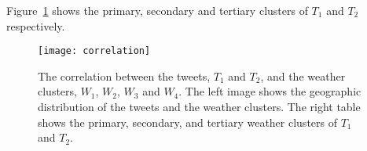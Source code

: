 Figure~\ref{fig:correlation} shows the primary, secondary and tertiary clusters of $T_1$ and $T_2$ respectively.

\begin{figure}[t]
\begin{center}
\texttt{[image: correlation]}
\end{center}
\vspace{-.1in}
\caption{The correlation between the tweets, $T_1$ and $T_2$, and the weather clusters, $W_1$, $W_2$, $W_3$ and $W_4$. The left image shows the geographic distribution of the tweets and the weather clusters. The right table shows the primary, secondary, and tertiary weather clusters of $T_1$ and $T_2$.}
\label{fig:correlation}
\end{figure}


%
%
%


